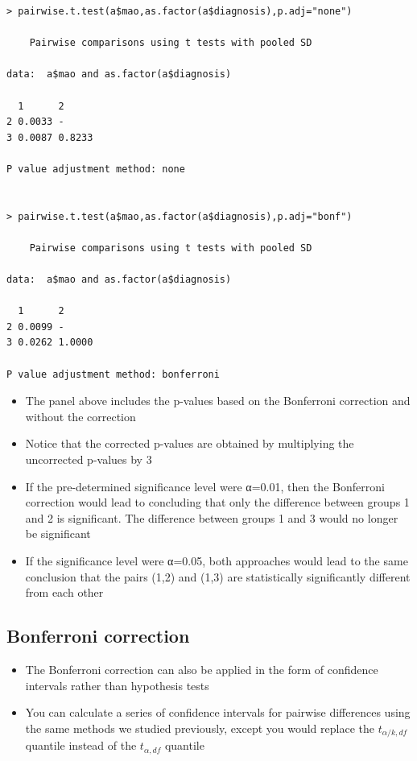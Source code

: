 \documentclass[
]{book}
\providecommand{\tightlist}{%
  \setlength{\itemsep}{0pt}\setlength{\parskip}{0pt}}
\begin{document}
\begin{verbatim}
> pairwise.t.test(a$mao,as.factor(a$diagnosis),p.adj="none")

    Pairwise comparisons using t tests with pooled SD 

data:  a$mao and as.factor(a$diagnosis) 

  1      2     
2 0.0033 -     
3 0.0087 0.8233

P value adjustment method: none 


> pairwise.t.test(a$mao,as.factor(a$diagnosis),p.adj="bonf")

    Pairwise comparisons using t tests with pooled SD 

data:  a$mao and as.factor(a$diagnosis) 

  1      2     
2 0.0099 -     
3 0.0262 1.0000

P value adjustment method: bonferroni
\end{verbatim}

\begin{itemize}
\tightlist
\item
  The panel above includes the p-values based on the Bonferroni correction and without the correction
\item
  Notice that the corrected p-values are obtained by multiplying the uncorrected p-values by 3
\item
  If the pre-determined significance level were α=0.01, then the Bonferroni correction would lead to concluding that only the difference between groups 1 and 2 is significant. The difference between groups 1 and 3 would no longer be significant
\item
  If the significance level were α=0.05, both approaches would lead to the same conclusion that the pairs (1,2) and (1,3) are statistically significantly different from each other
\end{itemize}

\hypertarget{bonferroni-correction-1}{%
\subsection{Bonferroni correction}\label{bonferroni-correction-1}}

\begin{itemize}
\tightlist
\item
  The Bonferroni correction can also be applied in the form of confidence intervals rather than hypothesis tests
\item
  You can calculate a series of confidence intervals for pairwise differences using the same methods we studied previously, except you would replace the \(t_{α/k,df}\) quantile instead of the \(t_{α,df}\) quantile
\end{itemize}
\end{document}
